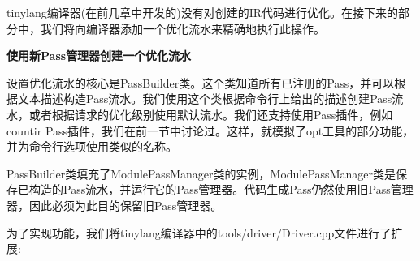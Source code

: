 
tinylang编译器(在前几章中开发的)没有对创建的IR代码进行优化。在接下来的部分中，我们将向编译器添加一个优化流水来精确地执行此操作。\par

\hspace*{\fill} \par %
\textbf{使用新Pass管理器创建一个优化流水}

设置优化流水的核心是PassBuilder类。这个类知道所有已注册的Pass，并可以根据文本描述构造Pass流水。我们使用这个类根据命令行上给出的描述创建Pass流水，或者根据请求的优化级别使用默认流水。我们还支持使用Pass插件，例如countir Pass插件，我们在前一节中讨论过。这样，就模拟了opt工具的部分功能，并为命令行选项使用类似的名称。\par

PassBuilder类填充了ModulePassManager类的实例，ModulePassManager类是保存已构造的Pass流水，并运行它的Pass管理器。代码生成Pass仍然使用旧Pass管理器，因此必须为此目的保留旧Pass管理器。 \par

为了实现功能，我们将tinylang编译器中的tools/driver/Driver.cpp文件进行了扩展:\par

